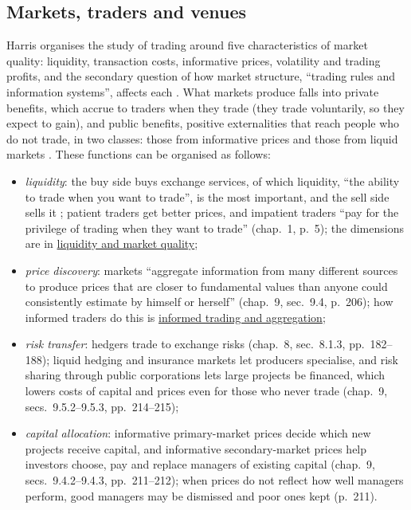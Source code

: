 \subsection{Markets, traders and venues}

\begin{qfdefinition}\label{def:market-functions}
 Harris organises the study of trading around five characteristics of market quality: liquidity, transaction costs, informative prices, volatility and trading profits, and the secondary question of how market structure, ``trading rules and information systems'', affects each \citep[chap.~1, sec.~1.2, p.~4]{alpha-harris}. What markets produce falls into private benefits, which accrue to traders when they trade (they trade voluntarily, so they expect to gain), and public benefits, positive externalities that reach people who do not trade, in two classes: those from informative prices and those from liquid markets \citep[chap.~9, secs.~9.1.1--9.3, pp.~205--206]{alpha-harris}. These functions can be organised as follows:
\begin{itemize}
\item \emph{liquidity}: the buy side buys exchange services, of which liquidity, ``the ability to trade when you want to trade'', is the most important, and the sell side sells it \citep[chap.~3, sec.~3.1, p.~32]{alpha-harris}; patient traders get better prices, and impatient traders ``pay for the privilege of trading when they want to trade'' (chap.~1, p.~5); the dimensions are in \hyperref[def:liquidity-dimensions]{liquidity and market quality};
\item \emph{price discovery}: markets ``aggregate information from many different sources to produce prices that are closer to fundamental values than anyone could consistently estimate by himself or herself'' (chap.~9, sec.~9.4, p.~206); how informed traders do this is \hyperref[res:informed-trading-aggregation]{informed trading and aggregation};
\item \emph{risk transfer}: hedgers trade to exchange risks (chap.~8, sec.~8.1.3, pp.~182--188); liquid hedging and insurance markets let producers specialise, and risk sharing through public corporations lets large projects be financed, which lowers costs of capital and prices even for those who never trade (chap.~9, secs.~9.5.2--9.5.3, pp.~214--215);
\item \emph{capital allocation}: informative primary-market prices decide which new projects receive capital, and informative secondary-market prices help investors choose, pay and replace managers of existing capital (chap.~9, secs.~9.4.2--9.4.3, pp.~211--212); when prices do not reflect how well managers perform, good managers may be dismissed and poor ones kept (p.~211).

\end{itemize}
\end{qfdefinition}
